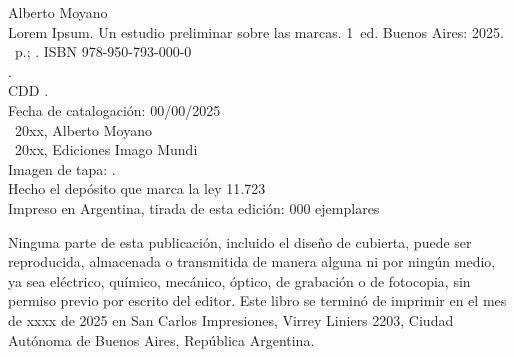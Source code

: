 \noindent Alberto Moyano \\
\noindent Lorem Ipsum. Un estudio preliminar sobre las marcas. 1~ed. Buenos Aires: 2025.\\
\noindent \ztotpages\ p.; \valorEspecifico. ISBN 978-950-793-000-0 \\
. \\
\noindent CDD .\\
\noindent Fecha de catalogación: 00/00/2025 \\
\noindent \textcopyright~20xx, Alberto Moyano \\
\noindent \textcopyright~20xx, Ediciones Imago Mundi\\
\noindent Imagen de tapa: .\\
\noindent Hecho el depósito que marca la ley 11.723\\
\noindent Impreso en Argentina, tirada de esta edición: 000 ejemplares\\

\vfill

\noindent {}\bigskip

\noindent Ninguna parte de esta publicación, incluido el diseño de cubierta, puede ser reproducida, almacenada o transmitida de manera alguna ni por ningún medio, ya sea eléctrico, químico, mecánico, óptico, de grabación o de fotocopia, sin permiso previo por escrito del editor. Este libro se terminó de imprimir en el mes de xxxx de 2025 en San Carlos Impresiones, Virrey Liniers 2203, Ciudad Autónoma de Buenos Aires, República Argentina.
